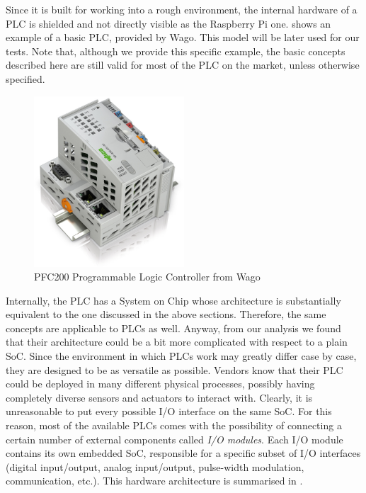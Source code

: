 Since it is built for working into a rough environment, the internal hardware of a PLC is shielded and not directly visible as the Raspberry Pi one.
 shows an example of a basic PLC, provided by Wago. This model will be later used for our tests.
Note that, although we provide this specific example, the basic concepts described here are still valid for most of the PLC on the market, unless otherwise specified.

\begin{figure}[h]
\centerline{\includegraphics[width=0.5\textwidth]{res/wagoplc}}
\caption{PFC200 Programmable Logic Controller from Wago \label{fig:wagoplc}}
\end{figure}

Internally, the PLC has a System on Chip whose architecture is substantially equivalent to the one discussed in the above sections.
Therefore, the same concepts are applicable to PLCs as well.
Anyway, from our analysis we found that their architecture could be a bit more complicated with respect to a plain SoC.
Since the environment in which PLCs work may greatly differ case by case, they are designed to be as versatile as possible.
Vendors know that their PLC could be deployed in many different physical processes, possibly having completely diverse sensors and actuators to interact with.
Clearly, it is unreasonable to put every possible I/O interface on the same SoC. For this reason, most of the available PLCs comes with the possibility
of connecting a certain number of external components called \emph{I/O modules}. Each I/O module contains its own embedded SoC,
responsible for a specific subset of I/O interfaces (\eg digital input/output, analog input/output, pulse-width modulation, communication, etc.).
This hardware architecture is summarised in .

